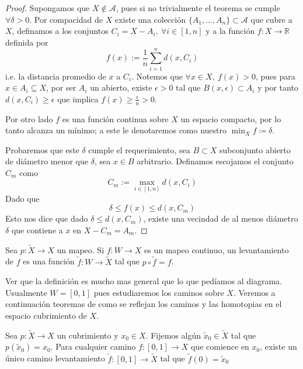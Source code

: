 \begin{proof}
  Supongamos que \(X \not \in \mathcal A\), pues si no trivialmente el
  teorema se cumple \(\forall \delta > 0\). Por compacidad de \(X\)
  existe una colección \(\{A_1,\dotsc,A_n\} \subset \mathcal A\) que
  cubre a \(X\), definamos a los conjuntos \(C_i = X - A_i,\ \forall i
  \in [1,n]\) y a la función \(f : X \to \mathbb R\) definida por
  \[ f(x) := \frac 1 n \sum_{i=1}^{n} d(x, C_i) \]
  i.e. la distancia promedio de \(x\) a \(C_i\). Notemos que \(\forall x
  \in X,\ f(x) > 0\), pues para \(x \in A_i \subseteq X\), por ser
  \(A_i\) un abierto, existe \(\epsilon > 0\) tal que \(B(x,\epsilon)
  \subset A_i\) y por tanto \(d(x, C_i) \geq \epsilon\) que implica \(
  f(x) \geq \frac \epsilon n > 0\).

  Por otro lado \(f\) es una función continua sobre \(X\) un espacio
  compacto, por lo tanto alcanza un mínimo; a este le denotaremos como
  nuestro \(\min_X f \coloneqq \delta \).

  Probaremos que este \(\delta\) cumple el requerimiento, sea \(B
  \subset X\) subconjunto abierto de diámetro menor que \(\delta\), sea
  \(x \in B\) arbitrario. Definamos escojamos el conjunto \(C_m\) como
  \[ C_m := \max_{i \in [1,n]} d(x, C_i) \]
  Dado que
  \[\delta \leq f(x) \leq d(x, C_m) \]
  Esto nos dice que dado \(\delta \leq d(x, C_m)\), existe una vecindad
  de al menos diámetro \(\delta\) que contiene a \(x\) en \(X - C_m = A_m\).
\end{proof}
\begin{definicion}[Levantamiento de \(f\)]
  Sea \(p : \tilde X \to X\) un mapeo. Si \(f : W \to X\) es un mapeo
  continuo, un levantamiento de \(f\) es una función \(\tilde f : W \to
  \tilde X\) tal que \(p \circ \tilde f = f\).
\end{definicion}
Ver que la definición es mucho mas general que lo que pedíamos al
diagrama. Usualmente \(W = [0,1]\) pues estudiaremos los caminos sobre
\(X\). Veremos a continuación teoremas de como se reflejan los caminos
y las homotopias en el espacio cubrimiento de \(X\).
\begin{teorema}\label{thm:lifting-theorem}
  Sea \(p : \tilde X \to X\) un cubrimiento y \(x_0 \in X\). Fijemos
  algún \(\tilde x _0 \in \tilde X\) tal que \(p(\tilde x _0) = x_0 \).
  Para cualquier camino \(f : [0,1] \to X\) que comience en \(x_0\), existe
  un único camino levantamiento \(\tilde f : [0,1] \to \tilde X\) tal que
  \(\tilde f (0) = \tilde x _0\)
\end{teorema}
